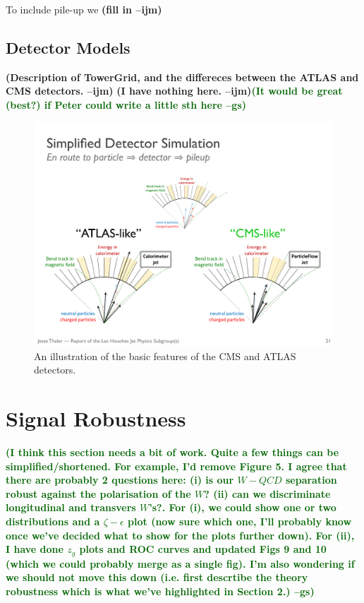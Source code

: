 \documentclass[11pt,letterpaper]{article}
\newcommand{\ijm}[1]{\textbf{\textcolor{llblue}{(#1 --ijm)}}}
\newcommand{\gs}[1]{\textbf{\textcolor{darkgreen}{(#1 --gs)}}}
\begin{document}
To include pile-up we \ijm{fill in}


\subsection{Detector Models}\label{sec:det_model}

\ijm{Description of TowerGrid, and the differeces between the ATLAS and CMS detectors. }
\ijm{I have nothing here.}\gs{It would be great (best?) if Peter could
  write a little sth here} 

\begin{figure}
\begin{center}
\includegraphics[width=1.0\columnwidth]{figures/CMS_vs_ATLAS_detector}
\end{center}
\caption{An illustration of the basic features of the CMS and ATLAS detectors.}
\end{figure}




\section{Signal Robustness}\label{sec:polar}

\gs{I think this section needs a bit of work. Quite a few things can
  be simplified/shortened. For example, I'd remove Figure 5. I agree
  that there are probably 2 questions here: (i) is our $W-QCD$
  separation robust against the polarisation of the $W$? (ii) can we
  discriminate longitudinal and transvers $W$'s?. For (i), we could
  show one or two distributions and a $\zeta-\epsilon$ plot (now sure
  which one, I'll probably know once we've decided what to show for
  the plots further down). For (ii), I have done $z_g$ plots and ROC
  curves and updated Figs 9 and 10 (which we could probably merge as a
  single fig). I'm also wondering if we should not move this down
  (i.e. first descrtibe the theory robustness which is what we've
  highlighted in Section 2.)}
\end{document}
